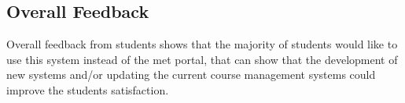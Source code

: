 \subsection{Overall Feedback}
\label{sub:overall-feedback}
Overall feedback from students shows that the majority of students would like to use this system instead of the \ac{met} portal, that
can show that the development of new systems and/or updating the current course management systems could improve the students satisfaction.
